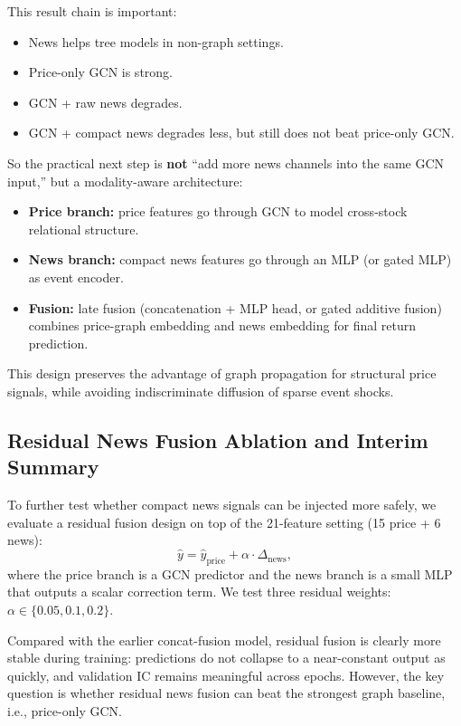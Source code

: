 This result chain is important:
\begin{itemize}
\item News helps tree models in non-graph settings.
\item Price-only GCN is strong.
\item GCN + raw news degrades.
\item GCN + compact news degrades less, but still does not beat price-only GCN.
\end{itemize}

So the practical next step is \textbf{not} ``add more news channels into the same GCN input,'' but a modality-aware architecture:
\begin{itemize}
\item \textbf{Price branch:} price features go through GCN to model cross-stock relational structure.
\item \textbf{News branch:} compact news features go through an MLP (or gated MLP) as event encoder.
\item \textbf{Fusion:} late fusion (concatenation + MLP head, or gated additive fusion) combines price-graph embedding and news embedding for final return prediction.
\end{itemize}

This design preserves the advantage of graph propagation for structural price signals, while avoiding indiscriminate diffusion of sparse event shocks.

\subsection{Residual News Fusion Ablation and Interim Summary}

To further test whether compact news signals can be injected more safely, we evaluate a residual fusion design on top of the 21-feature setting (15 price + 6 news):
\[
\hat{y} = \hat{y}_{\text{price}} + \alpha \cdot \Delta_{\text{news}},
\]
where the price branch is a GCN predictor and the news branch is a small MLP that outputs a scalar correction term. We test three residual weights: $\alpha \in \{0.05, 0.1, 0.2\}$.

Compared with the earlier concat-fusion model, residual fusion is clearly more stable during training: predictions do not collapse to a near-constant output as quickly, and validation IC remains meaningful across epochs. However, the key question is whether residual news fusion can beat the strongest graph baseline, i.e., price-only GCN.


